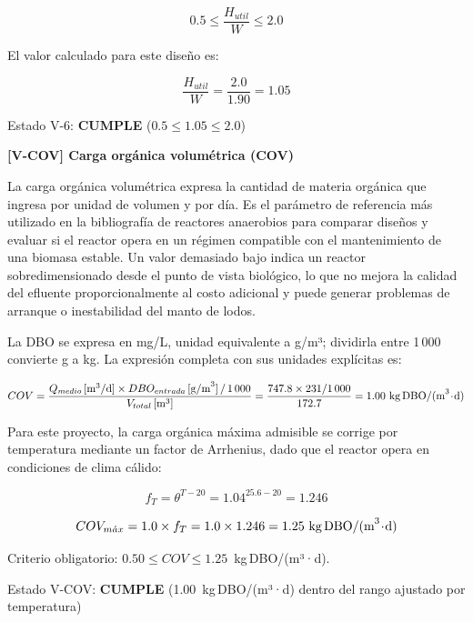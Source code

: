 \documentclass[12pt,a4paper]{article}
\begin{document}
\begin{equation}
0.5 \leq \frac{H_{util}}{W} \leq 2.0
\end{equation}

El valor calculado para este diseño es:

\begin{equation}
\frac{H_{util}}{W} = \frac{2.0}{1.90} = 1.05
\end{equation}

Estado V-6: \textbf{CUMPLE} ($0.5 \leq 1.05 \leq 2.0$)

\textbf{[V-COV] Carga orgánica volumétrica (COV)}

La carga orgánica volumétrica expresa la cantidad de materia orgánica que ingresa por unidad de volumen y por día. Es el parámetro de referencia más utilizado en la bibliografía de reactores anaerobios para comparar diseños y evaluar si el reactor opera en un régimen compatible con el mantenimiento de una biomasa estable. Un valor demasiado bajo indica un reactor sobredimensionado desde el punto de vista biológico, lo que no mejora la calidad del efluente proporcionalmente al costo adicional y puede generar problemas de arranque o inestabilidad del manto de lodos.

La DBO se expresa en mg/L, unidad equivalente a g/m³; dividirla entre 1\,000 convierte g a kg. La expresión completa con sus unidades explícitas es:

\begin{equation}
COV = \frac{Q_{medio} \,[\text{m}^3/\text{d}] \times DBO_{entrada} \,[\text{g/m}^3] \,/\, 1\,000}{V_{total} \,[\text{m}^3]} = \frac{747.8 \times 231 / 1\,000}{172.7} = 1.00 \text{ kg\,DBO/(m}^3\!\cdot\!\text{d)}
\end{equation}

Para este proyecto, la carga orgánica máxima admisible se corrige por temperatura mediante un factor de Arrhenius, dado que el reactor opera en condiciones de clima cálido:

\begin{equation}
f_T = \theta^{T - 20} = 1.04^{25.6 - 20} = 1.246
\end{equation}

\begin{equation}
COV_{m\acute{a}x} = 1.0 \times f_T = 1.0 \times 1.246 = 1.25 \text{ kg\,DBO/(m}^3\!\cdot\!\text{d)}
\end{equation}

Criterio obligatorio: $0.50 \leq COV \leq 1.25$~kg\,DBO/(m³·d).

Estado V-COV: \textbf{CUMPLE} (1.00~kg\,DBO/(m³·d) dentro del rango ajustado por temperatura)
\end{document}
